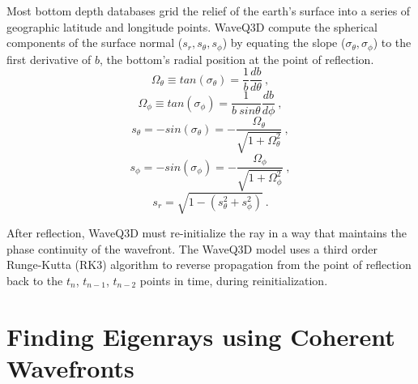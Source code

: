 \documentclass{ws-jca}
\begin{document}
Most bottom depth databases grid the relief of the earth's surface into a
series of geographic latitude and longitude points. WaveQ3D compute the spherical components of the
surface normal (\( s_r, s_\theta, s_\phi\)) by equating the
slope (\(\sigma_\theta, \sigma_\phi\)) to the first derivative of $b$, the
bottom's radial position at the point of reflection.
\begin{equation}
	\Omega_\theta \equiv tan(\sigma_\theta) 
		= \frac{1}{b} \frac{db}{d\theta} \:,
	\label{eq:slope_theta}
\end{equation}
\begin{equation}
	\Omega_\phi \equiv tan(\sigma_\phi) 
		= \frac{1}{b \: sin\theta} \frac{db}{d\phi} \:,
	\label{eq:slope_phi}
\end{equation}
\begin{equation}
	s_\theta = - sin(\sigma_\theta) 
		= -\frac{\Omega_\theta}{ \sqrt{1+\Omega^2_\theta} } \:,
	\label{eq:normal_theta}
\end{equation}
\begin{equation}
	s_\phi = - sin(\sigma_\phi) 
		= -\frac{\Omega_\phi}{ \sqrt{1+\Omega^2_\phi} } \:,
	\label{eq:normal_phi}
\end{equation}
\begin{equation}
	s_r = \sqrt{ 1- ( s^2_\theta + s^2_\phi )} \:.
	\label{eq:normal_r}
\end{equation}

After reflection, WaveQ3D must re-initialize the ray in a way that maintains the
phase continuity of the wavefront. The WaveQ3D model uses a third order
Runge-Kutta (RK3) algorithm to reverse propagation from the point of
reflection back to the \(t_n\), \(t_{n-1}\), \(t_{n-2}\) points in time, during reinitialization.

\section{Finding Eigenrays using Coherent Wavefronts}
\end{document}
